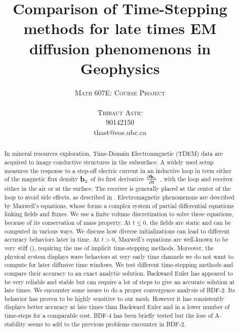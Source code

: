 \documentclass[twoside]{article}
\title{\vspace{-15mm}\fontsize{20pt}{10pt}\selectfont\textbf{Comparison of Time-Stepping methods for late times EM diffusion phenomenons in Geophysics}} %
\author{
\Large
\textsc{Math 607E: Course Project}
\\\\
\large
\textsc{Thibaut Astic}\\%
\textsc{90142150} \\ %
\normalsize thast@eos.ubc.ca
\vspace{-5mm}
}
\date{}
\begin{document}
\maketitle %



\begin{abstract}

In mineral resources exploration, Time-Domain Electromagnetic (TDEM) data are acquired to image conductive structures in the subsurface. A widely used setup measures the response to a step-off electric current in an inductive loop in term either of the magnetic flux density ${\bf b}_z$ of its first derivative $\frac{\partial {\bf b}_z}{\partial t}$ , with the loop and receiver either in the air or at the surface. The receiver is generally placed at the center of the loop to avoid side effects, as described in \cite{WH:1988}. Electromagnetic phenomenons are described by Maxwell's equations, whose forms a complex system of partial differential equations linking fields and fluxes. We use a finite volume discretization to solve these equations, because of its conservation of mass property. At $t\leq 0$, the fields are static and can be computed in various ways. We discuss how diverse initializations can lead to different accuracy behaviors later in time. At $t>0$, Maxwell's equations are well-known to be very stiff (\cite{HAO:2004}), requiring the use of implicit time-stepping methods. Moreover, the physical system displays wave behaviors at very early time channels we do not want to compute for later diffusive time windows. We test different time-stepping methods and compare their accuracy to an exact analytic solution. Backward Euler has appeared to be very reliable and stable but can require a lot of steps to give an accurate solution at late times. We encounter some issues to do a proper convergence analysis of BDF-2. Its behavior has proven to be highly sensitive to our mesh. However it has consistently displays better accuracy at late times than Backward Euler and in a lower number of time-steps for a comparable cost. BDF-4 has been briefly tested but the lose of A-stability seems to add to the previous problems encounter in BDF-2. 


\end{abstract}
\end{document}
